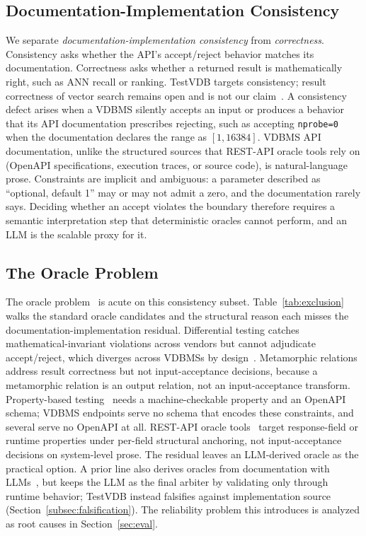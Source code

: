 \documentclass[sigconf]{acmart}
\begin{document}
\subsection{Documentation-Implementation Consistency}
\label{subsec:consistency}

We separate \emph{documentation-implementation consistency} from \emph{correctness}. Consistency asks whether the API's accept/reject behavior matches its documentation. Correctness asks whether a returned result is mathematically right, such as ANN recall or ranking. TestVDB targets consistency; result correctness of vector search remains open and is not our claim~\cite{roadmap25}. A consistency defect arises when a VDBMS silently accepts an input or produces a behavior that its API documentation prescribes rejecting, such as accepting \texttt{nprobe=0} when the documentation declares the range as $[1, 16384]$. VDBMS API documentation, unlike the structured sources that REST-API oracle tools rely on (OpenAPI specifications, execution traces, or source code), is natural-language prose. Constraints are implicit and ambiguous: a parameter described as ``optional, default 1'' may or may not admit a zero, and the documentation rarely says. Deciding whether an accept violates the boundary therefore requires a semantic interpretation step that deterministic oracles cannot perform, and an LLM is the scalable proxy for it.

\subsection{The Oracle Problem}
\label{subsec:oracle}

The oracle problem~\cite{barr15} is acute on this consistency subset. Table~\ref{tab:exclusion} walks the standard oracle candidates and the structural reason each misses the documentation-implementation residual. Differential testing catches mathematical-invariant violations across vendors but cannot adjudicate accept/reject, which diverges across VDBMSs by design~\cite{roadmap25}. Metamorphic relations~\cite{metmap24} address result correctness but not input-acceptance decisions, because a metamorphic relation is an output relation, not an input-acceptance transform. Property-based testing~\cite{claessen00} needs a machine-checkable property and an OpenAPI schema; VDBMS endpoints serve no schema that encodes these constraints, and several serve no OpenAPI at all. REST-API oracle tools~\cite{agoraplus25,satori25,mastor26} target response-field or runtime properties under per-field structural anchoring, not input-acceptance decisions on system-level prose. The residual leaves an LLM-derived oracle as the practical option. A prior line also derives oracles from documentation with LLMs~\cite{toradocu16,augmentest25}, but keeps the LLM as the final arbiter by validating only through runtime behavior; TestVDB instead falsifies against implementation source (Section~\ref{subsec:falsification}). The reliability problem this introduces is analyzed as root causes in Section~\ref{sec:eval}.
\end{document}
